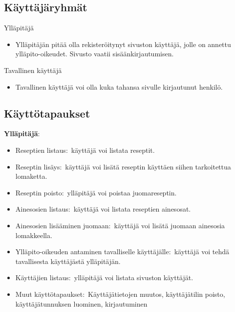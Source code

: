 \documentclass[a4paper]{article}
\begin{document}
\subsection{Käyttäjäryhmät}

\begin{flushleft}Ylläpitäjä\end{flushleft}
\begin{itemize}
\item Ylläpitäjän pitää olla rekisteröitynyt sivuston käyttäjä, jolle on annettu ylläpito-oikeudet. Sivusto vaatii sisäänkirjautumisen.
\end{itemize}
\begin{flushleft}Tavallinen käyttäjä\end{flushleft}
\begin{itemize}
\item Tavallinen käyttäjä voi olla kuka tahansa sivulle kirjautunut henkilö. 
\end{itemize}

\newpage
\subsection{Käyttötapaukset}

\begin{flushleft}\textbf{Ylläpitäjä\(\colon\)} \end{flushleft}
\begin{itemize}
	\item Reseptien listaus\(\colon\) käyttäjä voi listata reseptit.
	\item Reseptin lisäys\(\colon\) käyttäjä voi lisätä reseptin käyttäen siihen tarkoitettua lomaketta. 
	\item Reseptin poisto\(\colon\) ylläpitäjä voi poistaa juomareseptin.
	\item Ainesosien listaus\(\colon\) käyttäjä voi listata reseptien ainesosat.
	\item Ainesosien lisääminen juomaan\(\colon\) käyttäjä voi lisätä juomaan ainesosia lomakkeella.
	\item Ylläpito-oikeuden antaminen tavalliselle käyttäjälle\(\colon\) käyttäjä voi tehdä tavallisesta käyttäjästä ylläpitäjän.
	\item Käyttäjien listaus\(\colon\) ylläpitäjä voi listata sivuston käyttäjät.
	\item Muut käyttötapaukset\(\colon\) Käyttäjätietojen muutos, käyttäjätilin poisto, käyttäjätunnuksen luominen, kirjautuminen
\end{itemize}
\end{document}
